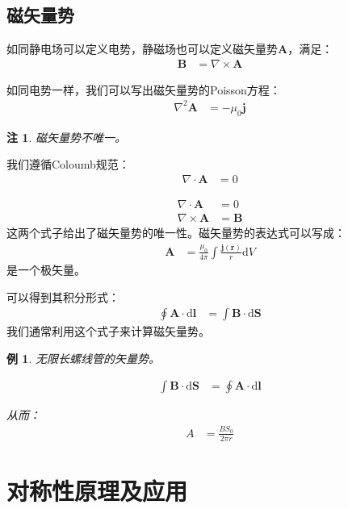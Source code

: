 \documentclass[12pt,onecolumn,a4paper]{book}
\newtheorem*{example}{例}
\newtheorem*{note}{注}
\numberwithin{table}{subsection}
\numberwithin{equation}{subsection}
\begin{document}
\subsection{磁矢量势}

如同静电场可以定义电势，静磁场也可以定义磁矢量势$\mathbf{A}$，满足：
\begin{align}
    \mathbf{B} & = \nabla \times \mathbf{A}
\end{align}

如同电势一样，我们可以写出磁矢量势的Poisson方程：
\begin{align}
    \nabla^2 \mathbf{A} & = -\mu_0 \mathbf{j}
\end{align}

\begin{note}
    磁矢量势不唯一。
\end{note}

我们遵循Coloumb规范：
\begin{align}
    \nabla \cdot \mathbf{A} & = 0
\end{align}

\begin{align}
    \nabla \cdot \mathbf{A}  & = 0          \\
    \nabla \times \mathbf{A} & = \mathbf{B}
\end{align}
这两个式子给出了磁矢量势的唯一性。磁矢量势的表达式可以写成：
\begin{align}
    \mathbf{A} & = \frac{\mu_0}{4\pi} \int \frac{  \mathbf{j} (\mathbf{r})}{r} \mathrm{d} V
\end{align}
是一个极矢量。


可以得到其积分形式：
\begin{align}
    \oint \mathbf{A} \cdot \mathrm{d} \mathbf{l} & = \int \mathbf{B} \cdot \mathrm{d} \mathbf{S}
\end{align}
我们通常利用这个式子来计算磁矢量势。

\begin{example}
    无限长螺线管的矢量势。

    \begin{align}
        \int \mathbf{B} \cdot \mathrm{d} \mathbf{S} & = \oint \mathbf{A} \cdot \mathrm{d} \mathbf{l}
    \end{align}

    从而：
    \begin{align}
        A & = \frac{BS_0}{2\pi r}
    \end{align}
\end{example}

\section{对称性原理及应用}
\end{document}
